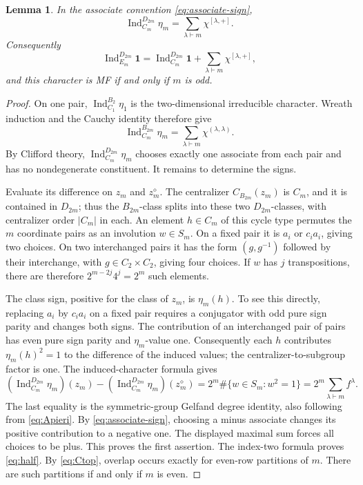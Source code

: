 \documentclass[11pt]{article}
\numberwithin{equation}{section}
\newtheorem{lemma}[theorem]{Lemma}
\theoremstyle{definition}
\DeclareMathOperator{\Ind}{Ind}
\newcommand{\one}{\mathbf 1}
\newcommand{\diagauto}{\diamond}
\begin{document}
\begin{lemma}\label{lem:half}
In the associate convention \eqref{eq:associate-sign},
\[
 \Ind_{C_m}^{D_{2m}}\eta_m=\sum_{\lambda\vdash m}\chi^{[\lambda,+]}.
 \]
Consequently
\begin{equation}
 \Ind_{E_m}^{D_{2m}}\one
 =\Ind_{C_m}^{D_{2m}}\one+\sum_{\lambda\vdash m}\chi^{[\lambda,+]},
 \label{eq:half}
\end{equation}
and this character is MF if and only if \(m\) is odd.
\end{lemma}
\begin{proof}
On one pair, \(\Ind_{C_1}^{B_2}\eta_1\) is the two-dimensional irreducible character.
Wreath induction and the Cauchy identity therefore give
\[
 \Ind_{C_m}^{B_{2m}}\eta_m
       =\sum_{\lambda\vdash m}\chi^{(\lambda,\lambda)} .
\]
By Clifford theory, \(\Ind_{C_m}^{D_{2m}}\eta_m\) chooses exactly one associate from each pair and has no nondegenerate constituent.
It remains to determine the signs.

Evaluate its difference on \(z_m\) and \(z_m^\diagauto\).
The centralizer \(C_{B_{2m}}(z_m)\) is \(C_m\), and it is contained in \(D_{2m}\); thus the \(B_{2m}\)-class splits into these two \(D_{2m}\)-classes, with centralizer order \(|C_m|\) in each.
An element \(h\in C_m\) of this cycle type permutes the \(m\) coordinate pairs as an involution \(w\in S_m\).
On a fixed pair it is \(a_i\) or \(c_i a_i\), giving two choices.
On two interchanged pairs it has the form \((g,g^{-1})\) followed by their interchange, with \(g\in C_2\times C_2\), giving four choices.
If \(w\) has \(j\) transpositions, there are therefore \(2^{m-2j}4^j=2^m\) such elements.

The class sign, positive for the class of \(z_m\), is \(\eta_m(h)\).
To see this directly, replacing \(a_i\) by \(c_i a_i\) on a fixed pair requires a conjugator with odd pure sign parity and changes both signs.
The contribution of an interchanged pair of pairs has even pure sign parity and \(\eta_m\)-value one.
Consequently each \(h\) contributes \(\eta_m(h)^2=1\) to the difference of the induced values; the centralizer-to-subgroup factor is one.
The induced-character formula gives
\[
 \left(\Ind_{C_m}^{D_{2m}}\eta_m\right)(z_m)
 -\left(\Ind_{C_m}^{D_{2m}}\eta_m\right)(z_m^\diagauto)
 =2^m\#\{w\in S_m:w^2=1\}
 =2^m\sum_{\lambda\vdash m}f^\lambda .
\]
The last equality is the symmetric-group Gelfand degree identity, also following from \eqref{eq:Apieri}.
By \eqref{eq:associate-sign}, choosing a minus associate changes its positive contribution to a negative one.
The displayed maximal sum forces all choices to be plus.
This proves the first assertion.
The index-two formula proves \eqref{eq:half}.
By \eqref{eq:Ctop}, overlap occurs exactly for even-row partitions of \(m\).
There are such partitions if and only if \(m\) is even.
\end{proof}
\end{document}
